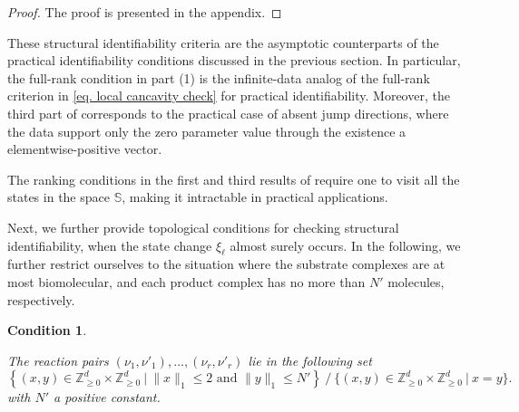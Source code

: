 \documentclass[pdflatex,sn-mathphys-num]{sn-jnl}%
\theoremstyle{thmstyleone}%
\theoremstyle{thmstyletwo}%
\newtheorem{condition}{Condition}
\theoremstyle{thmstylethree}%
\begin{document}
\begin{proof}
   The proof is presented in the appendix.
\end{proof}

These structural identifiability criteria are the asymptotic counterparts of the practical identifiability conditions discussed in the previous section. 
In particular, the full-rank condition in part (1) is the infinite-data analog of the full-rank criterion in \eqref{eq. local cancavity check} for practical identifiability.
Moreover, the third part of  corresponds to the practical case of absent jump directions, where the data support only the zero parameter value through the existence a elementwise-positive vector. 

The ranking conditions in the first and third results of  require one to visit all the states in the space $\mathbb S$, making it intractable in practical applications. 

Next, we further provide topological conditions for checking structural identifiability, when the state change $\xi_\ell$ almost surely occurs. 
In the following, we further restrict ourselves to the situation where the substrate complexes are at most biomolecular, and each product complex has no more than $N'$ molecules, respectively.

\begin{condition}\label{conditions number of molecules in each complex}

The reaction pairs $(\nu_1, \nu'_1), \dots, (\nu_r, \nu'_r)$ lie in the following set  
\[\left\{ (x, y) \in \mathbb Z^d_{\geq 0} \times \mathbb Z^d_{\geq 0} ~\big|~ \|x\|_1 \leq 2 \text{ and } \|y\|_1 \leq N' \right\} \ \big/ \ \big\{(x, y)\in\mathbb Z^{d}_{\geq 0} \times \mathbb Z^{d}_{\geq 0} ~\big|~ x = y \big\}.
\]
with $N'$ a positive constant. 
\end{condition}
\end{document}
